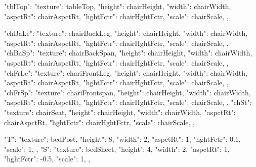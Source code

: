 {  "tblTop": {
    "texture": tableTop,
    "height": chairHeight,
    "width": chairWidth,
    "aspctRt": chairAspctRt,
    "hghtFctr": chairHghtFctr,
    "scale": chairScale,
  },  

  "chBaLe": {
    "texture": chairBackLeg,
    "height": chairHeight,
    "width": chairWidth,
    "aspctRt": chairAspctRt,
    "hghtFctr": chairHghtFctr,
    "scale": chairScale,
  },  
  "chBaSp": {
    "texture": chairBackSpan,
    "height": chairHeight,
    "width": chairWidth,
    "aspctRt": chairAspctRt,
    "hghtFctr": chairHghtFctr,
    "scale": chairScale,
  },
  "chFrLe": {
    "texture": chariFrontLeg,
    "height": chairHeight,
    "width": chairWidth,
    "aspctRt": chairAspctRt,
    "hghtFctr": chairHghtFctr,
    "scale": chairScale,
  },
  "chFrSp": {
    "texture": chariFrontspan,
    "height": chairHeight,
    "width": chairWidth,
    "aspctRt": chairAspctRt,
    "hghtFctr": chairHghtFctr,
    "scale": chairScale,
  },
  "chSt": {
    "texture": chairSeat,
    "height": chairHeight,
    "width": chairWidth,
    "aspctRt": chairAspctRt,
    "hghtFctr": chairHghtFctr,
    "scale": chairScale,
  },

  "T": {
    "texture": bedPost,
    "height": 8,
    "width": 2,
    "aspctRt": 1,
    "hghtFctr": 0.1,
    "scale": 1,
  },  
  "S": {
    "texture": bedSheet,
    "height": 4,
    "width": 2,
    "aspctRt": 1,
    "hghtFctr": -0.5,
    "scale": 1,
  },

}
